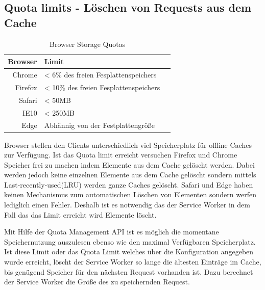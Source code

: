 \begin{description}

\section{Quota limits - Löschen von Requests aus dem Cache}
\begin{table}[!htb]
	\begin{center}


	\begin{tabular}{|r|l|l|}
		\hline
		Browser	 & Limit \\ \hline
		Chrome & < 6\% des freien Fesplattenspeichers \\ \hline
		Firefox & < 10\% des freien Fesplattenspeichers \\ \hline
		Safari & < 50MB \\ \hline
		IE10 & < 250MB \\ \hline
		Edge & Abhännig von der Festplattengröße \\ 
		\hline
	\end{tabular}
	\caption{Browser Storage Quotas\cite{offline-pwa}}

\end{center}
\end{table}

Browser stellen den Clients unterschiedlich viel Speicherplatz für offline Caches zur Verfügung. Ist das Quota limit erreicht versuchen Firefox und Chrome Speicher frei zu machen indem Elemente aus dem Cache gelöscht werden. Dabei werden jedoch keine einzelnen Elemente aus dem Cache gelöscht sondern mittels Last-recently-used(LRU) werden ganze Caches gelöscht. Safari und Edge haben keinen Mechanismus zum automatischen Löschen von Elementen sondern werfen lediglich einen Fehler.\cite{offline-pwa} Deshalb ist es notwendig das der Service Worker in dem Fall das das Limit erreicht wird Elemente löscht.

Mit Hilfe der Quota Management API\cite{quota-api-ff} ist es möglich die momentane Speichernutzung auszulesen ebenso wie den maximal Verfügbaren Speicherplatz. Ist diese Limit oder das Quota Limit welches über die Konfiguration angegeben wurde erreicht, löscht der Service Worker so lange die ältesten Einträge im Cache, bis genügend Speicher für den nächsten Request vorhanden ist. Dazu berechnet der Service Worker die Größe des zu speichernden Request. 


\end{description}
